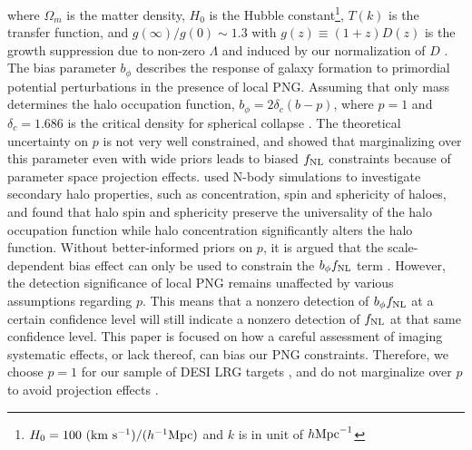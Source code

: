 where $\Omega_{m}$ is the matter density, $H_{0}$ is the Hubble constant\footnote{$H_{0}=100~({\rm km}~{\rm s}^{-1})/(h^{-1}{\rm Mpc})$ and $k$ is in unit of $h {\rm Mpc}^{-1}$}, $T(k)$ is the transfer function, and $g(\infty)/g(0) \sim 1.3$ with $g(z)\equiv (1+z) D(z)$ is the growth suppression due to non-zero $\Lambda$ and induced by our normalization of $D$ \citep[see, e.g.,][]{2010JCAP...07..013R, 2019MNRAS.485.4160M}. The bias parameter $b_{\phi}$ describes the response of galaxy formation to primordial potential perturbations in the presence of local PNG. Assuming that only mass determines the halo occupation function, $b_{\phi} = 2 \delta_{c}(b - p)$, where $p=1$ and $\delta_{c}= 1.686$ is the critical density for spherical collapse \citep{fillmore1984self}. The theoretical uncertainty on $p$ is not very well constrained, and \cite{2022JCAP...11..013B} showed that marginalizing over this parameter even with wide priors leads to biased $f_{\rm NL}$ constraints because of parameter space projection effects. \cite{2023JCAP...01..023L} used N-body simulations to investigate secondary halo properties, such as concentration, spin and sphericity of haloes, and found that halo spin and sphericity preserve the universality of the halo occupation function while halo concentration significantly alters the halo function. Without better-informed priors on $p$, it is argued that the scale-dependent bias effect can only  be used to constrain the $b_{\phi}f_{\rm NL}$ term \citep[see, e.g.,][]{2020JCAP...12..013B, 2020JCAP...12..031B}. However, the detection significance of local PNG remains unaffected by various assumptions regarding $p$. This means that a nonzero detection of $b_{\phi}f_{\rm NL}$ at a certain confidence level will still indicate a nonzero detection of $f_{\rm NL}$ at that same confidence level. This paper is focused on how a careful assessment of imaging systematic effects, or lack thereof, can bias our PNG constraints. Therefore, we choose $p=1$ for our sample of DESI LRG targets \citep[see, also,][]{slosar2008constraints,2010JCAP...07..013R,2013MNRAS.428.1116R}, and do not marginalize over $p$ to avoid projection effects \citep{2022JCAP...11..013B}.


